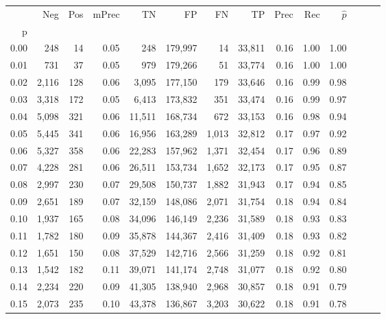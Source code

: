 \begin{tabular}{rrrrrrrrrrrrrr}
\toprule
{} &    Neg &  Pos & mPrec &       TN &       FP &      FN &      TP &  Prec &   Rec & $\hat{p}$ \\
p    &        &      &       &          &          &         &         &       &       &           \\
\midrule
0.00 &    248 &   14 &  0.05 &      248 &  179,997 &      14 &  33,811 &  0.16 &  1.00 &      1.00 \\
0.01 &    731 &   37 &  0.05 &      979 &  179,266 &      51 &  33,774 &  0.16 &  1.00 &      1.00 \\
0.02 &  2,116 &  128 &  0.06 &    3,095 &  177,150 &     179 &  33,646 &  0.16 &  0.99 &      0.98 \\
0.03 &  3,318 &  172 &  0.05 &    6,413 &  173,832 &     351 &  33,474 &  0.16 &  0.99 &      0.97 \\
0.04 &  5,098 &  321 &  0.06 &   11,511 &  168,734 &     672 &  33,153 &  0.16 &  0.98 &      0.94 \\
0.05 &  5,445 &  341 &  0.06 &   16,956 &  163,289 &   1,013 &  32,812 &  0.17 &  0.97 &      0.92 \\
0.06 &  5,327 &  358 &  0.06 &   22,283 &  157,962 &   1,371 &  32,454 &  0.17 &  0.96 &      0.89 \\
0.07 &  4,228 &  281 &  0.06 &   26,511 &  153,734 &   1,652 &  32,173 &  0.17 &  0.95 &      0.87 \\
0.08 &  2,997 &  230 &  0.07 &   29,508 &  150,737 &   1,882 &  31,943 &  0.17 &  0.94 &      0.85 \\
0.09 &  2,651 &  189 &  0.07 &   32,159 &  148,086 &   2,071 &  31,754 &  0.18 &  0.94 &      0.84 \\
0.10 &  1,937 &  165 &  0.08 &   34,096 &  146,149 &   2,236 &  31,589 &  0.18 &  0.93 &      0.83 \\
0.11 &  1,782 &  180 &  0.09 &   35,878 &  144,367 &   2,416 &  31,409 &  0.18 &  0.93 &      0.82 \\
0.12 &  1,651 &  150 &  0.08 &   37,529 &  142,716 &   2,566 &  31,259 &  0.18 &  0.92 &      0.81 \\
0.13 &  1,542 &  182 &  0.11 &   39,071 &  141,174 &   2,748 &  31,077 &  0.18 &  0.92 &      0.80 \\
0.14 &  2,234 &  220 &  0.09 &   41,305 &  138,940 &   2,968 &  30,857 &  0.18 &  0.91 &      0.79 \\
0.15 &  2,073 &  235 &  0.10 &   43,378 &  136,867 &   3,203 &  30,622 &  0.18 &  0.91 &      0.78 \\

\end{tabular}
